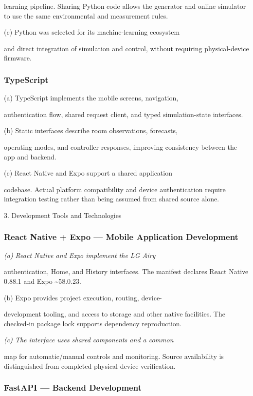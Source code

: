 \documentclass[conference]{IEEEtran}
\begin{document}
learning pipeline. Sharing Python code allows the generator and online simulator to use the same environmental and measurement rules.

(c) Python was selected for its machine-learning ecosystem

and direct integration of simulation and control, without requiring physical-device firmware.

\subsubsection{TypeScript}

(a) TypeScript implements the mobile screens, navigation,

authentication flow, shared request client, and typed simulation-state interfaces.

(b) Static interfaces describe room observations, forecasts,

operating modes, and controller responses, improving consistency between the app and backend.

(c) React Native and Expo support a shared application

codebase. Actual platform compatibility and device authentication require integration testing rather than being assumed from shared source alone.

3. Development Tools and Technologies

\subsubsection{React Native + Expo --- Mobile Application Development}

\cite{ref7,ref8}

\emph{(a) React Native and Expo implement the LG Airy}

authentication, Home, and History interfaces. The manifest declares React Native 0.88.1 and Expo \textasciitilde{}58.0.23.

(b) Expo provides project execution, routing, device-

development tooling, and access to storage and other native facilities. The checked-in package lock supports dependency reproduction.

\emph{(c) The interface uses shared components and a common}

map for automatic/manual controls and monitoring. Source availability is distinguished from completed physical-device verification.

\subsubsection{FastAPI --- Backend Development \cite{ref9}}
\end{document}

